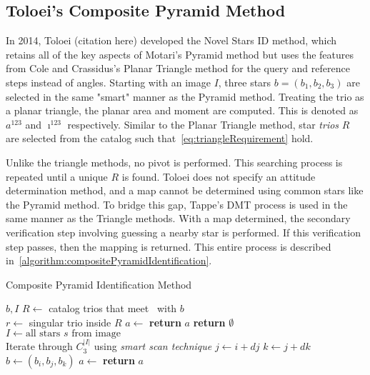 \subsection{Toloei's Composite Pyramid Method}\label{subsec:toloei'sCompositePyramidMethod}
In 2014, Toloei (citation here) developed the Novel Stars ID method, which retains all of the key aspects of Motari's
Pyramid method but uses the features from Cole and Crassidus's Planar Triangle method for the query and reference steps
instead of angles.
Starting with an image $I$, three stars $b = (b_1, b_2, b_3)$ are selected in the same "smart" manner as the Pyramid
method.
Treating the trio as a planar triangle, the planar area and moment are computed.
This is denoted as $a^{123}$ and $\imath^{123}$ respectively.
Similar to the Planar Triangle method, star \textit{trios} $R$ are selected from the catalog such
that~\autoref{eq:triangleRequirement} hold.

Unlike the triangle methods, no pivot is performed.
This searching process is repeated until a unique $R$ is found.
Toloei does not specify an attitude determination method, and a map cannot be determined using common
stars like the Pyramid method.
To bridge this gap, Tappe's DMT process is used in the same manner as the Triangle methods.
With a map determined, the secondary verification step involving guessing a nearby star is performed.
If this verification step passes, then the mapping is returned.
This entire process is described in~\autoref{algorithm:compositePyramidIdentification}.

\begin{algorithm}
    \caption{Composite Pyramid Identification Method} \label{algorithm:compositePyramidIdentification}
    \begin{algorithmic}[1]
         {$b, I$}
        \State $R \gets $ catalog trios that meet~ with $b$
        \\
        \State $r \gets $ singular trio inside $R$
        \State $a \gets $ 
        \State \textbf{return} $a$
        \EndIf
        \EndIf
        \State \textbf{return } $\emptyset$
        \EndFunction
        \\
        \State $I \gets \text{all stars } s \text{ from image}$
        \\
        \LineComment Iterate through $C^{|I|}_3$ using \textit{smart scan technique}
        \State $j \gets i + dj$
        \State $k \gets j + dk$
        \\
        \State $b \gets (b_i, b_j, b_k)$
        \State $a \gets$ 
        \State \textbf{return} $a$
        \EndIf
        \EndFor
        \EndFor
        \EndFor
        \EndProcedure
    \end{algorithmic}
\end{algorithm}

